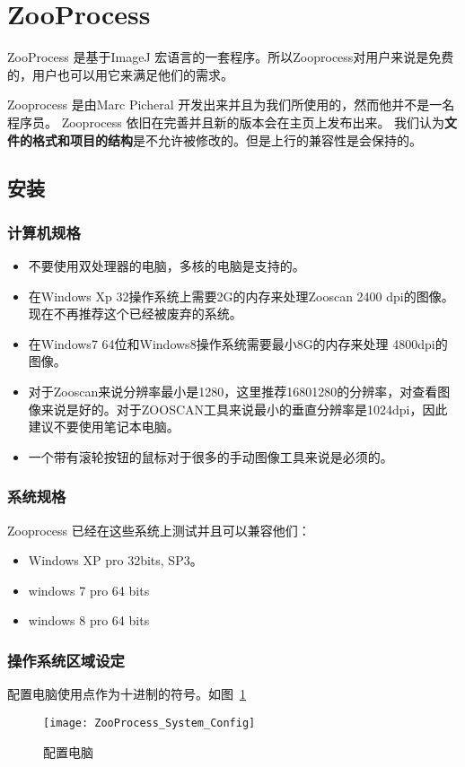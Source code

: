 \section{ZooProcess}

ZooProcess 是基于ImageJ 宏语言的一套程序。所以Zooprocess对用户来说是免费的，用户也可以用它来满足他们的需求。

Zooprocess 是由Marc Picheral 开发出来并且为我们所使用的，然而他并不是一名程序员。 Zooprocess 依旧在完善并且新的版本会在主页上发布出来。 我们认为\textbf{文件的格式和项目的结构}是不允许被修改的。但是上行的兼容性是会保持的。

\subsection{安装}
	\subsubsection{计算机规格}
		\begin{itemize}
			\item 不要使用双处理器的电脑，多核的电脑是支持的。
			\item 在Windows Xp 32操作系统上需要2G的内存来处理Zooscan 2400 dpi的图像。现在不再推荐这个已经被废弃的系统。
			\item 在Windows7 64位和Windows8操作系统需要最小8G的内存来处理 4800dpi的图像。
			\item 对于Zooscan来说分辨率最小是1280，这里推荐1680\*1280的分辨率，对查看图像来说是好的。对于ZOOSCAN工具来说最小的垂直分辨率是1024dpi，因此建议不要使用笔记本电脑。
			\item 一个带有滚轮按钮的鼠标对于很多的手动图像工具来说是必须的。			
		\end{itemize}
	\subsubsection{系统规格}
	
		Zooprocess 已经在这些系统上测试并且可以兼容他们：
		\begin{itemize}
			\item Windows XP pro 32bits, SP3。
			\item windows 7 pro 64 bits
			\item windows 8 pro 64 bits	
		\end{itemize}
	\subsubsection{操作系统区域设定}
		配置电脑使用点作为十进制的符号。如图~\ref{fig:systemconfig}
		\begin{figure}[!ht]
    		\centering
    		\texttt{[image: ZooProcess\_System\_Config]}
    		\caption{配置电脑}
    		\label{fig:systemconfig}
    		\end{figure}
